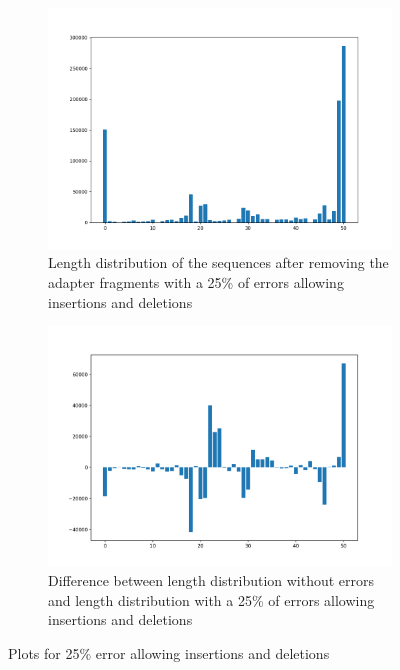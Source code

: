 \documentclass[a4paper,10pt]{article}
\begin{document}
\begin{figure}
    \centering
    \begin{subfigure}[b]{1\textwidth}
       \includegraphics[width=12cm]{images/length-distr-25-id.png}
       \caption{Length distribution of the sequences after removing the adapter fragments with a 25\% of errors allowing insertions and deletions}
       \label{fig:25id} 
    \end{subfigure}
    
    \begin{subfigure}[b]{1\textwidth}
       \includegraphics[width=12cm]{images/length-distr-length-distr-25-id.png}
       \caption{Difference between length distribution without errors and length distribution with a 25\% of errors allowing insertions and deletions}
       \label{fig:diff25id}
    \end{subfigure}
    
    \caption{Plots for 25\% error allowing insertions and deletions}
\end{figure}
\end{document}
